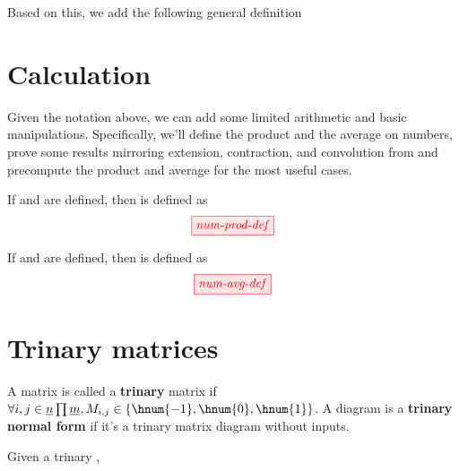 Based on this, we add the following general definition

\section{Calculation}\label{sec:calculation}
Given the notation above, we can add some limited arithmetic and basic
manipulations. Specifically, we'll define the product and the average on
numbers, prove some results mirroring extension, contraction, and convolution
from \cite{backens2018zhcalculus} and precompute the product and average for the
most useful cases.

\begin{definition}
    If  and  are defined, then  is defined as
    $$\tikzfig{num-prod-def}$$
\end{definition}

\begin{definition}
    If  and  are defined, then  is defined as
    $$\tikzfig{num-avg-def}$$
\end{definition}


\section{Trinary matrices}

\begin{definition}
    A matrix  is called a \textbf{trinary} matrix if%
    $\forall i,j \in \underline{n} \prod \underline{m}, M_{i,j} \in \{\hnum{-1},%
    \hnum{0},\hnum{1}\}$. A diagram is a \textbf{trinary normal form} if it's a
    trinary matrix diagram without inputs.
\end{definition}

\begin{lemma}\label{lem:extclosed}
    Given a trinary , 
\end{lemma}

